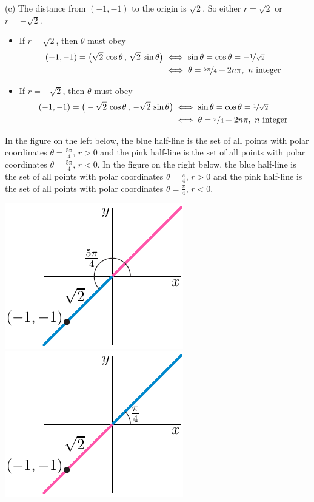 \begin{solution}
(c)
The distance from $(-1,-1)$ to the origin is $\sqrt{2}$. 
So either $r=\sqrt{2}$ or $r=-\sqrt{2}$.
\begin{itemize}
\item If $r=\sqrt{2}$, then $\theta$ must obey 
\begin{align*}
(-1,-1) = \big(\sqrt{2}\,\cos\theta\,,\,\sqrt{2}\,\sin\theta\big)
&\iff \sin\theta=\cos\theta=-\nicefrac{1}{\sqrt{2}} \\
&\iff \theta= \nicefrac{5\pi}{4} + 2n\pi,\ n\text{ integer }
\end{align*}
\item If $r=-\sqrt{2}$, then $\theta$ must obey 
\begin{align*}
(-1,-1) = \big(-\sqrt{2}\,\cos\theta\,,\,-\sqrt{2}\,\sin\theta\big)
&\iff \sin\theta=\cos\theta=\nicefrac{1}{\sqrt{2}} \\
&\iff \theta= \nicefrac{\pi}{4} + 2n\pi,\ n\text{ integer }
\end{align*}
\end{itemize}
In the figure on the left below, the blue half-line is the set of all points 
with polar coordinates $\theta=\frac{5\pi}{4}$, $r>0$ and the pink half-line 
is the set of all points  with polar coordinates 
$\theta=\frac{5\pi}{4}$, $r<0$. 
In the figure on the right below, the blue half-line is the set of all points 
with polar coordinates $\theta=\frac{\pi}{4}$, $r>0$ and the pink 
half-line is the set of all points  with polar coordinates 
$\theta=\frac{\pi}{4}$, $r<0$. 
\begin{center}
  \includegraphics{fig/polar5A.pdf}\qquad
  \includegraphics{fig/polar5B.pdf}
\end{center}

\end{solution}



